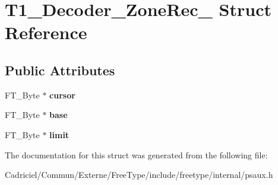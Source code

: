 \hypertarget{struct_t1___decoder___zone_rec__}{}\section{T1\+\_\+\+Decoder\+\_\+\+Zone\+Rec\+\_\+ Struct Reference}
\label{struct_t1___decoder___zone_rec__}
\subsection*{Public Attributes}
\begin{DoxyCompactItemize}
\item 
F\+T\+\_\+\+Byte $\ast$ {\bfseries cursor}\hypertarget{struct_t1___decoder___zone_rec___a14e9f190496672f6174ead91e375767d}{}\label{struct_t1___decoder___zone_rec___a14e9f190496672f6174ead91e375767d}

\item 
F\+T\+\_\+\+Byte $\ast$ {\bfseries base}\hypertarget{struct_t1___decoder___zone_rec___a9cd7e54387b238504b1e8aae47b7da7c}{}\label{struct_t1___decoder___zone_rec___a9cd7e54387b238504b1e8aae47b7da7c}

\item 
F\+T\+\_\+\+Byte $\ast$ {\bfseries limit}\hypertarget{struct_t1___decoder___zone_rec___a46fe1e4aa9bdb712ae414305f88d95db}{}\label{struct_t1___decoder___zone_rec___a46fe1e4aa9bdb712ae414305f88d95db}

\end{DoxyCompactItemize}


The documentation for this struct was generated from the following file\+:\begin{DoxyCompactItemize}
\item 
Cadriciel/\+Commun/\+Externe/\+Free\+Type/include/freetype/internal/psaux.\+h\end{DoxyCompactItemize}
